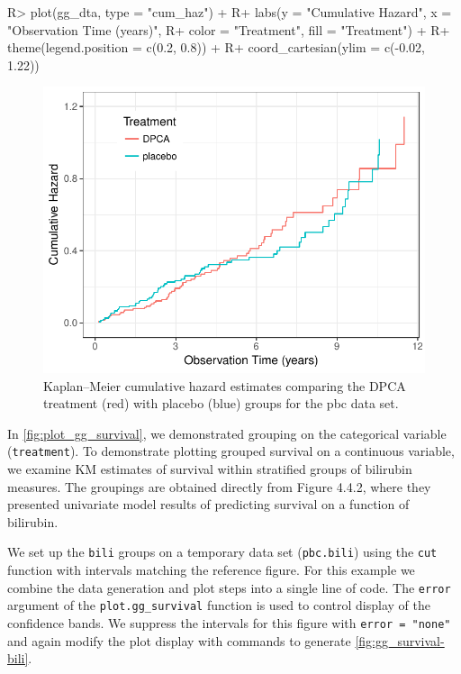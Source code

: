 \documentclass[article, nojss]{jss}
\begin{document}
\begin{Schunk}
\begin{Sinput}
R> plot(gg_dta, type = "cum_haz") +
R+   labs(y = "Cumulative Hazard", x = "Observation Time (years)",
R+        color = "Treatment", fill = "Treatment") +
R+   theme(legend.position = c(0.2, 0.8)) +
R+   coord_cartesian(ylim = c(-0.02, 1.22))
\end{Sinput}
\begin{figure}[!htb]

{\centering \includegraphics{rfs-plot_gg_cum_hazard-1}

}

\caption[Kaplan--Meier cumulative hazard estimates comparing the DPCA treatment (red) with placebo (blue) groups for the pbc data set]{Kaplan--Meier cumulative hazard estimates comparing the DPCA treatment (red) with placebo (blue) groups for the pbc data set.}\label{fig:plot_gg_cum_hazard}
\end{figure}
\end{Schunk}

In \autoref{fig:plot_gg_survival}, we demonstrated grouping on the
categorical variable (\texttt{treatment}). To demonstrate plotting
grouped survival on a continuous variable, we examine KM estimates of
survival within stratified groups of bilirubin measures. The groupings
are obtained directly from\citep{fleming:1991} Figure 4.4.2, where they
presented univariate model results of predicting survival on a function
of bilirubin.

We set up the \texttt{bili} groups on a temporary data set
(\texttt{pbc.bili}) using the \texttt{cut} function with intervals
matching the reference figure. For this example we combine the data
generation and plot steps into a single line of code. The \texttt{error}
argument of the \texttt{plot.gg\_survival} function is used to control
display of the confidence bands. We suppress the intervals for this
figure with \texttt{error\ =\ "none"} and again modify the plot display
with  commands to generate \autoref{fig:gg_survival-bili}.
\end{document}
